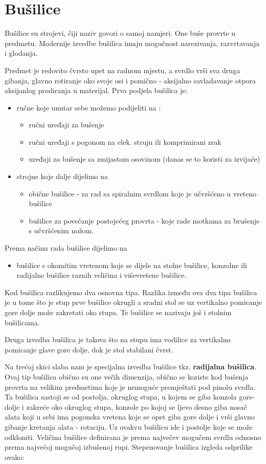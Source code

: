 \documentclass[a4paper,12pt]{article}
\numberwithin{figure}{section}
\begin{document}
\section{Bušilice}
Bušilice su strojevi, čiji naziv govori o samoj namjeri. One buše provrte u predmetu. Modernije izvedbe bušilica imaju mogučnost narezivanja, razvrtavanja i glodanja. \par
Predmet je redovito čvrsto upet na radnom mjestu, a svrdlo vrši sva druga gibanja, glavno rotiranje oko svoje osi i pomično - aksijalno savladavanje otpora aksijanlog prodiranja u materijal. 
Prva podjela bušilica je:
\begin{itemize}
\item ručne koje unutar sebe možemo podijeliti na :
\begin{itemize}
\item ručni uređaji za bušenje
\item ručni uređaji s pogonom na elek. struju ili komprimirani zrak
\item uređaji za bušenje sa zmijastom osovinom (danas se to koristi za izvijaće)
\end{itemize}
\item strojne koje dalje dijelimo na
\begin{itemize}
\item obične bušilice - za rad sa spiralnim svrdlom koje je učvršćeno u vreteno bušilice
\item bušilice za povečanje postojećeg provrta - koje rade motkama za brušenje s učvršćenim nožom.
\end{itemize}
\end{itemize} 
Prema načinu rada bušilice dijelimo na
\begin{itemize}
\item bušilice s okomitim vretenom koje se dijele na stolne bušilice, konzolne ili radijalne bušilice raznih veličina i viševretene bušilice.
\end{itemize}
Kod bušilica razlikujemo dva osnovna tipa.
Razlika između ova dva tipa  bušilica je u tome što je stup prve bušilice okrugli a sradni stol se uz vertikalno pomicanje gore dolje može zakretati oko stupa. Te bušilice se nazivaju još i stolnim bušilicama. \par
Druga izvedba bušilica je takova što na stupu ima vodilice za vertikalno pomicanje glave gore dolje, dok je stol stabilani čvrst. \par
Na trećoj skici slaba nam je specijalna izvedba bušilice tkz. \textbf{radijalna bušilica}. Ovaj tip bušilica obično su one večih dimenzija, obično se koriste kod bušenja provrta na velikim predmetima koje je nemoguće premještati pod pinolu svrdla. Ta bušilica sastoji se od postolja, okruglog stupa, u kojem se giba konzola gore-dolje i zakreće oko okruglog stupa, konzole po kojoj se ljevo desno giba nosač alata koji u sebi ima pogonska vretena koje se opet giba gore dolje i vrši glavno gibanje kretanja alata - rotaciju. Uz ovakvu bušilicu ide i postolje koje se može odkloniti. Veličina bušilice definirana je prema največev mogučem svrdlu odnosno prema največoj mogučoj izbušenoj rupi. Stepenovanje bušilica izgleda odprilike ovako:
\end{document}
